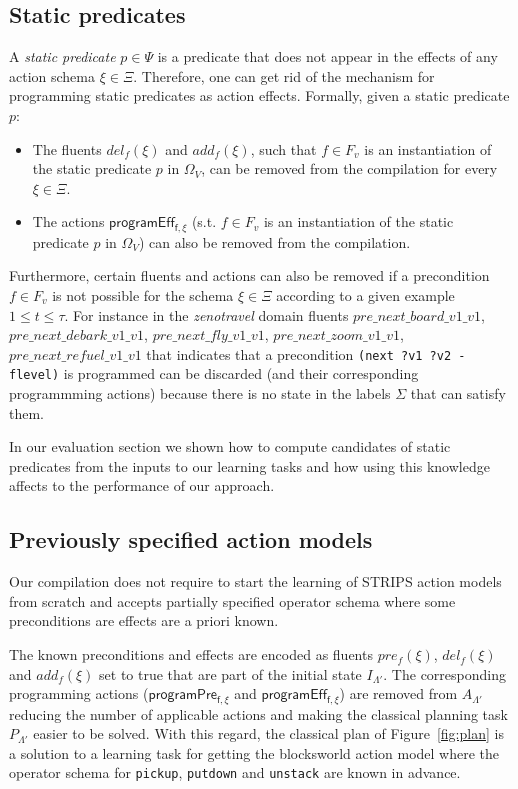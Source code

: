 \documentclass[letterpaper]{article} %
\begin{document}
\subsection{Static predicates}
A {\em static predicate} $p \in \Psi$ is a predicate that does not appear in the effects of any action schema $\xi\in\Xi$. Therefore, one can get rid of the mechanism for programming static predicates as action effects. Formally, given a static predicate $p$:
\begin{itemize}
\item The fluents $del_f(\xi)$ and $add_f(\xi)$, such that $f\in F_v$ is an instantiation of the static predicate $p$ in $\Omega_V$, can be removed from the compilation for every $\xi\in\Xi$.
\item The actions $\mathsf{programEff_{f,\xi}}$ (s.t. $f\in F_v$ is an instantiation of the static predicate $p$ in $\Omega_V$) can also be removed from the compilation.
\end{itemize}

Furthermore, certain fluents and actions can also be removed if a precondition $f\in F_v$ is not possible for the schema $\xi\in\Xi$ according to a given example {\small $1\leq t\leq \tau$}. For instance in the {\em zenotravel} domain fluents $pre\_next\_board\_v1\_v1$, $pre\_next\_debark\_v1\_v1$, $pre\_next\_fly\_v1\_v1$, $pre\_next\_zoom\_v1\_v1$, $pre\_next\_refuel\_v1\_v1$ that indicates that a precondition {\tt\small(next ?v1 ?v2 - flevel)} is programmed can be discarded (and their corresponding programmming actions) because there is no state in the labels $\Sigma$ that can satisfy them.

In our evaluation section we shown how to compute candidates of static predicates from the inputs to our learning tasks and how using this knowledge affects to the performance of our approach. 

\subsection{Previously specified action models}
Our compilation does not require to start the learning of STRIPS action models from scratch and accepts partially specified operator schema where some preconditions are effects are a priori known.

The known preconditions and effects are encoded as fluents $pre_f(\xi)$, $del_f(\xi)$ and $add_f(\xi)$ set to true that are part of the initial state $I_{\Lambda'}$. The corresponding programming actions ($\mathsf{programPre_{f,\xi}}$ and $\mathsf{programEff_{f,\xi}}$) are removed from $A_{\Lambda'}$ reducing the number of applicable actions  and making the classical planning task $P_{\Lambda'}$ easier to be solved. With this regard, the classical plan of Figure~\ref{fig:plan} is a solution to a learning task for getting the blocksworld action model where the operator schema for {\tt\small pickup}, {\tt\small putdown} and {\tt\small unstack} are known in advance. 
\end{document}

